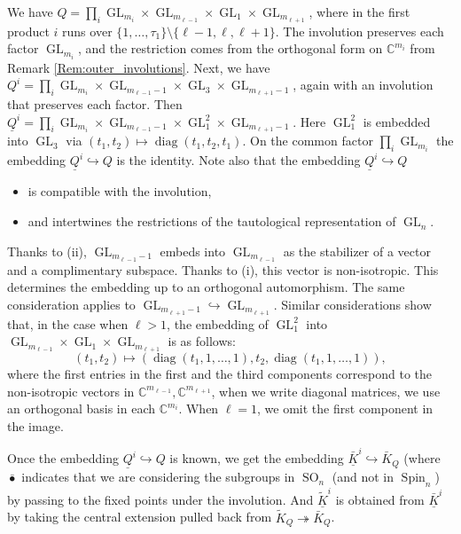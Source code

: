 \documentclass[12pt]{amsart}
\newcommand{\C}{\mathbb{C}}
\newcommand{\GL}{\operatorname{GL}}
\theoremstyle{definition}
\numberwithin{equation}{section}
\begin{document}
We have $Q=\prod_{i}\operatorname{GL}_{m_i}\times \GL_{m_{\ell-1}}\times \GL_1
\times \GL_{m_{\ell+1}}$, where in the first product $i$ runs over
$\{1,\ldots,\tau_1\}\setminus \{\ell-1,\ell,\ell+1\}$. The involution preserves
each factor $\GL_{m_i}$,  and the restriction comes from the orthogonal form on $\C^{m_i}$ from Remark \ref{Rem:outer_involutions}. Next, we have
$Q^i=\prod_{i}\operatorname{GL}_{m_i}\times \GL_{m_{\ell-1}-1}\times \GL_3
\times \GL_{m_{\ell+1}-1}$, again with an involution that preserves each factor.
Then $\underline{Q}^i=\prod_{i}\operatorname{GL}_{m_i}\times \GL_{m_{\ell-1}-1}\times \GL_1^2
\times \GL_{m_{\ell+1}-1}$. Here $\GL_1^2$ is embedded into $\GL_3$ via
$(t_1,t_2)\mapsto \operatorname{diag}(t_1,t_2,t_1)$. On the common factor $\prod_{i}\operatorname{GL}_{m_i}$
the embedding $\underline{Q}^i\hookrightarrow Q$ is the identity. Note also that the
embedding $\underline{Q}^i\hookrightarrow Q$
\begin{itemize}
\item[(i)] is compatible with the involution,
\item[(ii)] and intertwines the restrictions of the tautological representation of
$\operatorname{GL}_n$.
\end{itemize}

Thanks to (ii), $\operatorname{GL}_{m_{\ell-1}-1}$ embeds into $\operatorname{GL}_{m_{\ell-1}}$
as the stabilizer of a vector and a complimentary subspace. Thanks to (i), this vector
is non-isotropic. This determines the embedding up to an orthogonal automorphism.
The same consideration applies to $\operatorname{GL}_{m_{\ell+1}-1}
\hookrightarrow\operatorname{GL}_{m_{\ell+1}}$. Similar considerations show that, in the case when $\ell>1$,
the embedding of $\operatorname{GL}_1^2$ into $\GL_{m_{\ell-1}}\times \GL_1
\times \GL_{m_{\ell+1}}$ is as follows:
\begin{equation}\label{eq:embed_GL}
	(t_1,t_2)\mapsto (\operatorname{diag}(t_1,1,\ldots,1), t_2, \operatorname{diag}(t_1,1,\ldots,1)),
\end{equation}
where the first entries in the first and the third components correspond to the non-isotropic
vectors in $\C^{m_{\ell-1}},\C^{m_{\ell+1}}$, when we write diagonal matrices, we use an orthogonal basis in each $\C^{m_i}$. When $\ell=1$, we omit the first component in
the image.

Once the embedding $\underline{Q}^i\hookrightarrow Q$ is known, we get the embedding
$\underline{\bar{K}}^i\hookrightarrow \bar{K}_Q$ (where $\bar{\bullet}$ indicates that we are considering the subgroups in $\operatorname{SO}_n$ (and not in 
$\operatorname{Spin}_n$) by passing to the fixed points under the involution.
And $\underline{\tilde{K}}^i$ is obtained from $\underline{\bar{K}}^i$ by taking the central extension pulled back from $\tilde{K}_Q\twoheadrightarrow \bar{K}_Q$.
\end{document}
